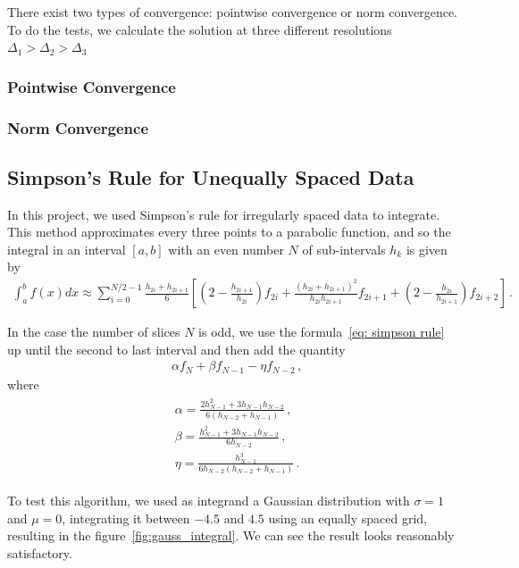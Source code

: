 \documentclass[11pt]{article}
\begin{document}
There exist two types of convergence: pointwise convergence or norm convergence. To do the tests, we calculate the solution at three different resolutions $\Delta_1 > \Delta_2 > \Delta_3$

\subsubsection*{Pointwise Convergence}



\subsubsection*{Norm Convergence}


\subsection{Simpson's Rule for Unequally Spaced Data}

In this project, we used Simpson's rule for irregularly spaced data to integrate. This method approximates every three points to a parabolic function, and so the integral in an interval $[a,b]$ with an even number $N$ of sub-intervals $h_k$ is given by
\begin{align}
    \int_a^b f(x) dx\approx\sum_{i=0}^{N/2-1}\frac{h_{2i}+h_{2i+1}}{6}\left[\left(2-\frac{h_{2i+1}}{h_{2i}}\right)f_{2i}+\frac{(h_{2i}+h_{2i+1})^2}{h_{2i}h_{2i+1}}f_{2i+1}+\left(2-\frac{h_{2i}}{h_{2i+1}}\right)f_{2i+2}\right] \, .
    \label{eq: simpson rule}
\end{align}

In the case the number of slices $N$ is odd, we use the formula~\eqref{eq: simpson rule} up until the second to last interval and then add the quantity
\begin{align}
    &\alpha f_N + \beta f_{N-1} - \eta f_{N-2}\, ,
\end{align}
where
\begin{gather}
    \begin{aligned}
        &\alpha=\frac{2h_{N-1}^2+3h_{N-1}h_{N-2}}{6(h_{N-2}+h_{N-1})}\, ,\\
        &\beta=\frac{h_{N-1}^2+3h_{N-1}h_{N-2}}{6h_{N-2}}\, ,\\
        &\eta=\frac{h_{N-1}^3}{6h_{N-2}(h_{N-2}+h_{N-1})}\, .
    \end{aligned}
\end{gather}

To test this algorithm, we used as integrand a Gaussian distribution with $\sigma=1$ and $\mu=0$, integrating it between $-4.5$ and $4.5$ using an equally spaced grid, resulting in the figure~\ref{fig:gauss_integral}. We can see the result looks reasonably satisfactory.
\end{document}
